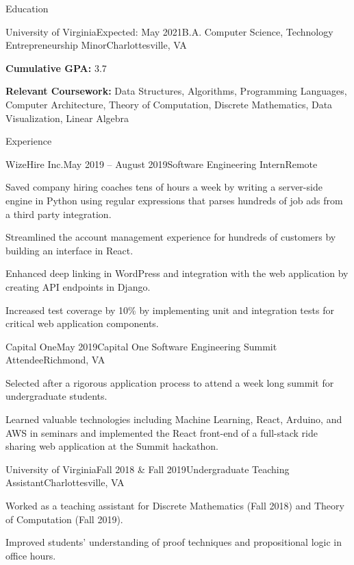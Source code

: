 \documentclass{resume}
\begin{document}
\vspace{-1em}
\begin{rSection}{Education}

  \begin{rSubsection}{University of Virginia}{Expected: May 2021}{B.A. Computer Science, Technology Entrepreneurship Minor}{Charlottesville, VA}
    \item \textbf{Cumulative GPA:} 3.7
    \item \textbf{Relevant Coursework:} Data Structures, Algorithms, Programming Languages, Computer Architecture, Theory of Computation, Discrete Mathematics, Data Visualization, Linear Algebra
  \end{rSubsection}

\end{rSection}

\begin{rSection}{Experience}

  \begin{rSubsection}{WizeHire Inc.}{May 2019 -- August 2019}{Software Engineering Intern}{Remote}
    \item Saved company hiring coaches tens of hours a week by writing a server-side engine in Python using regular expressions that parses hundreds of job ads from a third party integration.
    \item Streamlined the account management experience for hundreds of customers by building an interface in React.
    \item Enhanced deep linking in WordPress and integration with the web application by creating API endpoints in Django.
    \item Increased test coverage by 10\% by implementing unit and integration tests for critical web application components.
  \end{rSubsection}

  \begin{rSubsection}{Capital One}{May 2019}{Capital One Software Engineering Summit Attendee}{Richmond, VA}
    \item Selected after a rigorous application process to attend a week long summit for undergraduate students.
    \item Learned valuable technologies including Machine Learning, React, Arduino, and AWS in seminars and implemented the React front-end of a full-stack ride sharing web application at the Summit hackathon.
  \end{rSubsection}

  \begin{rSubsection}{University of Virginia}{Fall 2018 \& Fall 2019}{Undergraduate Teaching Assistant}{Charlottesville, VA}
    \item Worked as a teaching assistant for Discrete Mathematics (Fall 2018) and Theory of Computation (Fall 2019).
    \item Improved students' understanding of proof techniques and propositional logic in office hours.
  \end{rSubsection}


\end{rSection}
\end{document}
